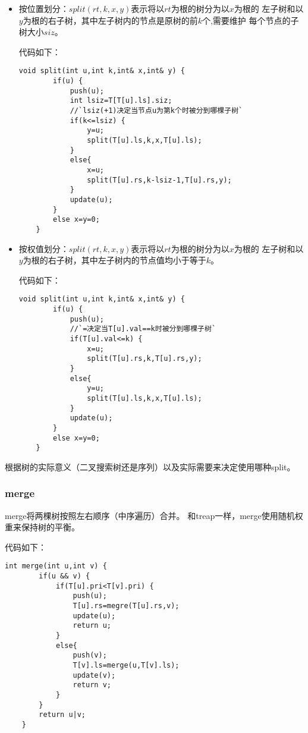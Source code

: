 \begin{itemize}
	\item
	      按位置划分：$split(rt,k,x,y)$表示将以$rt$为根的树分为以$x$为根的
	      左子树和以$y$为根的右子树，其中左子树内的节点是原树的前$k$个,需要维护
	      每个节点的子树大小$siz$。

	      代码如下：
	      \begin{lstlisting}[title=splitKth]
    void split(int u,int k,int& x,int& y) {
        if(u) {
            push(u);
            int lsiz=T[T[u].ls].siz;
            //`lsiz(+1)决定当节点u为第k个时被分到哪棵子树`
            if(k<=lsiz) {
                y=u;
                split(T[u].ls,k,x,T[u].ls);
            }
            else{
                x=u;
                split(T[u].rs,k-lsiz-1,T[u].rs,y);
            }
            update(u);
        }
        else x=y=0;
    }
\end{lstlisting}
	\item
	      按权值划分：$split(rt,k,x,y)$表示将以$rt$为根的树分为以$x$为根的
	      左子树和以$y$为根的右子树，其中左子树内的节点值均小于等于$k$。

	      代码如下：
	      \begin{lstlisting}[title=splitKey]
    void split(int u,int k,int& x,int& y) {
        if(u) {
            push(u);
            //`=决定当T[u].val==k时被分到哪棵子树`
            if(T[u].val<=k) {
                x=u;
                split(T[u].rs,k,T[u].rs,y);
            }
            else{
                y=u;
                split(T[u].ls,k,x,T[u].ls);
            }
            update(u);
        }
        else x=y=0;
    }
\end{lstlisting}
\end{itemize}

根据树的实际意义（二叉搜索树还是序列）以及实际需要来决定使用哪种split。

\subsubsection{merge}

merge将两棵树按照左右顺序（中序遍历）合并。
和treap一样，merge使用随机权重来保持树的平衡。

代码如下：

\begin{lstlisting}[title=merge]
    int merge(int u,int v) {
        if(u && v) {
            if(T[u].pri<T[v].pri) {
                push(u);
                T[u].rs=megre(T[u].rs,v);
                update(u);
                return u;
            }
            else{
                push(v);
                T[v].ls=merge(u,T[v].ls);
                update(v);
                return v;
            }
        }
        return u|v;
    }
\end{lstlisting}

